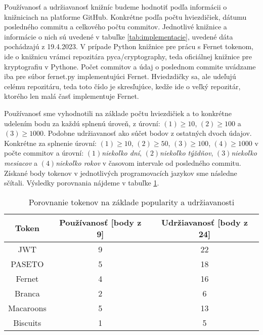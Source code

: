 Používanosť a udržiavanosť knižníc budeme hodnotiť podľa informácii o knižniciach na platforme GitHub. Konkrétne podľa počtu hviezdičiek, dátumu posledného commitu a celkového počtu commitov. Jednotlivé knižnice a informácie o nich sú uvedené v tabuľke \ref{tab:implementacie}, uvedené dáta pochádzajú z 19.4.2023. V prípade Python knižnice pre prácu s Fernet tokenom, ide o knižnicu vrámci repozitára pyca/cryptography, teda oficiálnej knižnice pre kryptografiu v Pythone. Počet commitov a údaj o poslednom commite uvádzame iba pre súbor fernet.py implementujúci Fernet. Hviedzdičky sa, ale udeľujú celému repozitáru, teda toto číslo je skresľujúce, kedže ide o veľký repozitár, ktorého len malá časť implementuje Fernet. 

Používanosť sme vyhodnotili na základe počtu hviezdičiek a to konkrétne udelením bodu za každú splnenú úroveň, z úrovní: $(1)\ge10$, $(2)\ge100$ a $(3)\ge1000$. Podobne udržiavanosť ako súčet bodov z ostatných dvoch údajov. Konkrétne za splnenie úrovní: $(1)\ge10$, $(2)\ge50$, $(3)\ge100$, $(4)\ge1000$ v počte commitov a úrovní: $(1)$\textit{niekoľko dní}, $(2)$\textit{niekoľko týždňov}, $(3)$\textit{niekoľko mesiacov} a $(4)$\textit{niekoľko rokov} v časovom intervale od posledného commitu. Získané body tokenov v jednotlivých programovacích jazykov sme následne sčítali. Výsledky porovnania nájdeme v tabuľke \ref{tab:popularita}.

\begin{table}
  \begin{center}
    \caption{Porovnanie tokenov na základe popularity a udržiavanosti}
    \label{tab:popularita} %

    \begin{tabular}{ccc}
      \hline
      Token & Používanosť [body z 9] & Udržiavanosť [body z 24]\\
      \hline
      JWT & 9 & 22 \\
      PASETO & 5 & 18 \\
      Fernet & 4 & 16 \\
      Branca & 2 & 6 \\
      Macaroons & 5 & 13 \\
      Biscuits & 1 & 5 \\
      \hline
    \end{tabular}
  \end{center}
\end{table}
